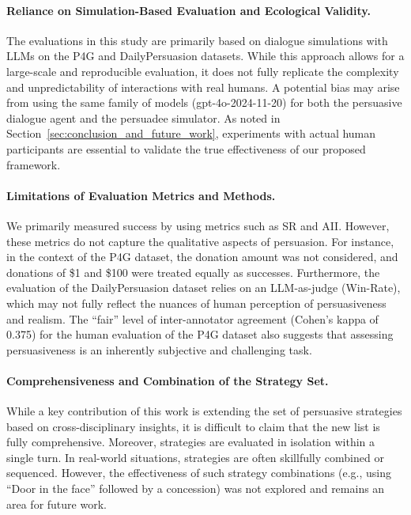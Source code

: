 \documentclass[11pt]{article}
\begin{document}
\paragraph{Reliance on Simulation-Based Evaluation and Ecological Validity.}
The evaluations in this study are primarily based on dialogue simulations with LLMs on the P4G and DailyPersuasion datasets. 
While this approach allows for a large-scale and reproducible evaluation, it does not fully replicate the complexity and unpredictability of interactions with real humans. 
A potential bias may arise from using the same family of models (gpt-4o-2024-11-20) for both the persuasive dialogue agent and the persuadee simulator. 
As noted in Section~\ref{sec:conclusion_and_future_work}, experiments with actual human participants are essential to validate the true effectiveness of our proposed framework.

\paragraph{Limitations of Evaluation Metrics and Methods.}
We primarily measured success by using metrics such as SR and AII. 
However, these metrics do not capture the qualitative aspects of persuasion. 
For instance, in the context of the P4G dataset, the donation amount was not considered, and donations of \$1 and \$100 were treated equally as successes.
Furthermore, the evaluation of the DailyPersuasion dataset relies on an LLM-as-judge (Win-Rate), which may not fully reflect the nuances of human perception of persuasiveness and realism. 
The ``fair'' level of inter-annotator agreement (Cohen's kappa of 0.375) for the human evaluation of the P4G dataset also suggests that assessing persuasiveness is an inherently subjective and challenging task.

\paragraph{Comprehensiveness and Combination of the Strategy Set.}
While a key contribution of this work is extending the set of persuasive strategies based on cross-disciplinary insights, it is difficult to claim that the new list is fully comprehensive. 
Moreover, strategies are evaluated in isolation within a single turn. 
In real-world situations, strategies are often skillfully combined or sequenced. 
However, the effectiveness of such strategy combinations (e.g., using ``Door in the face'' followed by a concession) was not explored and remains an area for future work.
\end{document}
